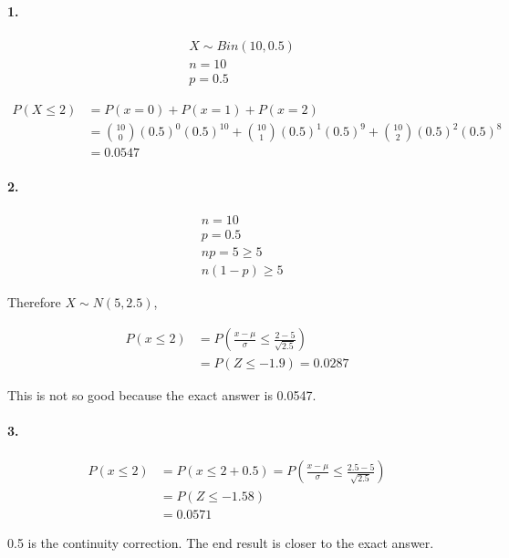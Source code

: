 \documentclass{article}
\begin{document}
    \paragraph{1.}

    \begin{align*}
        &X \sim Bin(10, 0.5)\\
        &n = 10\\
        &p = 0.5
    \end{align*}

    \begin{align*}
        P(X \leq 2) &=  P(x = 0) + P(x = 1) + P(x = 2)\\
        & = {10 \choose 0 }(0.5)^{0}(0.5)^{10} + {10 \choose 1} (0.5)^{1}(0.5)^{9} + {10 \choose 2} (0.5)^{2}(0.5)^{8}\\
        & = 0.0547
    \end{align*}

    \paragraph{2.}
    \begin{align*}
        &n = 10\\
        &p = 0.5\\
        &np = 5 \geq 5\\
        &n(1-p) \geq 5
    \end{align*}

    Therefore $X \sim N(5, 2.5)$,

    \begin{align*}
        P(x\leq 2) &= P(\frac{x - \mu}{\sigma} \leq \frac{2-5}{\sqrt{2.5}})\\
        &= P(Z\leq-1.9) = 0.0287
    \end{align*}

    This is not so good because the exact answer is 0.0547.

    \paragraph{3.}

    \begin{align*}
        P(x \leq 2) &= P(x \leq 2 + 0.5) = P(\frac{x - \mu}{\sigma} \leq \frac{2.5-5}{\sqrt{2.5}})\\
        &= P(Z\leq-1.58)\\
        &= 0.0571
    \end{align*}
    
    0.5 is the continuity correction. The end result is closer to the exact answer.
\end{document}

